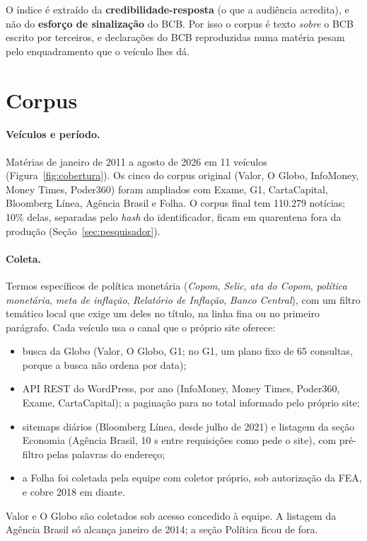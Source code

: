 \documentclass[11pt,a4paper]{article}
\begin{document}
O índice é extraído da \textbf{credibilidade-resposta} (o que a audiência
acredita), e não do \textbf{esforço de sinalização} do BCB. Por isso o corpus é
texto \emph{sobre} o BCB escrito por terceiros, e declarações do BCB
reproduzidas numa matéria pesam pelo enquadramento que o veículo lhes dá.

\section{Corpus}\label{sec:corpus}

\paragraph{Veículos e período.} Matérias de janeiro de 2011 a agosto de 2026
em 11 veículos (Figura~\ref{fig:cobertura}). Os cinco do corpus original
(Valor, O Globo, InfoMoney, Money Times, Poder360) foram ampliados com Exame,
G1, CartaCapital, Bloomberg Línea, Agência Brasil e Folha. O corpus final tem
110.279 notícias; 10\% delas, separadas pelo \emph{hash} do identificador, ficam
em quarentena fora da produção (Seção~\ref{sec:pesquisador}).

\paragraph{Coleta.} Termos específicos de política monetária (\emph{Copom},
\emph{Selic}, \emph{ata do Copom}, \emph{política monetária}, \emph{meta de
inflação}, \emph{Relatório de Inflação}, \emph{Banco Central}), com um filtro
temático local que exige um deles no título, na linha fina ou no primeiro
parágrafo. Cada veículo usa o canal que o próprio site oferece:
\begin{itemize}[leftmargin=1.5em,itemsep=0.1em]
  \item busca da Globo (Valor, O Globo, G1; no G1, um plano fixo de 65 consultas,
  porque a busca não ordena por data);
  \item API REST do WordPress, por ano (InfoMoney, Money Times, Poder360, Exame,
  CartaCapital); a paginação para no total informado pelo próprio site;
  \item sitemaps diários (Bloomberg Línea, desde julho de 2021) e listagem da
  seção Economia (Agência Brasil, 10 s entre requisições como pede o site),
  com pré-filtro pelas palavras do endereço;
  \item a Folha foi coletada pela equipe com coletor próprio, sob autorização
  da FEA, e cobre 2018 em diante.
\end{itemize}
Valor e O Globo são coletados sob acesso concedido à equipe. A listagem da
Agência Brasil só alcança janeiro de 2014; a seção Política ficou de fora.
\end{document}
